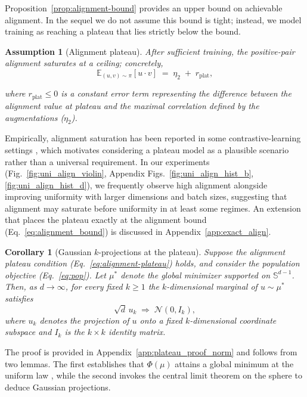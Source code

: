 \documentclass{article}
\newtheorem{assumption}{Assumption}
\newtheorem{corollary}{Corollary}
\newcommand{\E}{\mathbb{E}}
\newcommand{\Sph}{\mathbb{S}}
\newcommand{\peqref}[1]{(Eq.~\ref{#1})}
\begin{document}
Proposition~\ref{prop:alignment-bound} provides an upper bound on achievable alignment. In the sequel we do not assume this bound is tight; instead, we model training as reaching a plateau that lies strictly below the bound.
\begin{assumption}[Alignment plateau]
\label{assump:plateau}
After sufficient training, the positive-pair alignment saturates at a ceiling; concretely,
\begin{equation}
\label{eq:alignment-plateau}
\E_{(u,v)\sim\pi}[u\!\cdot\! v]\;=\;\eta_2 \;+\;  r_{\mathrm{plat}},
\end{equation}

where $r_{\mathrm{plat}} \le 0$ is a constant error term representing the difference between the alignment value at plateau and the maximal correlation defined by the augmentations ($\eta_2$).
\end{assumption}

Empirically, alignment saturation has been reported in some contrastive-learning settings \citep{wang2020understanding}, which motivates considering a plateau model as a plausible scenario rather than a universal requirement. In our experiments (Fig.~\ref{fig:uni_align_violin}, Appendix Figs.~\ref{fig:uni_align_hist_b}, \ref{fig:uni_align_hist_d}), we frequently observe high alignment alongside improving uniformity with larger dimensions and batch sizes, suggesting that alignment may saturate before uniformity in at least some regimes. An extension that places the plateau exactly at the alignment bound \peqref{eq:alignment_bound} is discussed in Appendix~\ref{app:exact_align}.

\begin{corollary}[Gaussian $k$-projections at the plateau]
\label{cor:gauss-k-simple}
Suppose the alignment plateau condition \peqref{eq:alignment-plateau} holds, and consider the population objective \peqref{eq:pop}.  
Let $\mu^*$ denote the global minimizer supported on $\Sph^{d-1}$. Then, as $d \to \infty$, for every fixed $k \geq 1$ the $k$-dimensional marginal of $u \sim \mu^*$ satisfies
\begin{equation}
\label{eq:gauss-k-unif}
\sqrt{d}\,u_k \;\Rightarrow\; \mathcal N(0, I_k),
\end{equation}
where $u_k$ denotes the projection of $u$ onto a fixed $k$-dimensional coordinate subspace and $I_k$ is the $k \times k$ identity matrix.
\end{corollary}

The proof is provided in Appendix~\ref{app:plateau_proof_norm} and follows from two lemmas. The first establishes that $\Phi(\mu)$ attains a global minimum at the uniform law \citep{wang2020understanding}, while the second invokes the central limit theorem on the sphere \citep{diaconis1987dozen} to deduce Gaussian projections.
\end{document}
